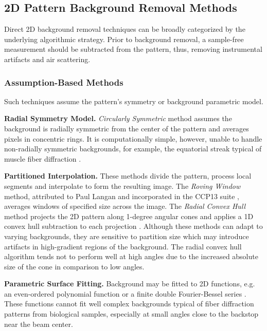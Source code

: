\documentclass[iucr,review]{iucrjournals}
\begin{document}
\subsection{2D Pattern Background Removal Methods}

Direct 2D background removal techniques can be broadly categorized by the underlying algorithmic strategy.
Prior to background removal, a sample-free measurement should be subtracted from the pattern,
thus, removing instrumental artifacts and air scattering.

    \subsubsection{Assumption-Based Methods}
        Such techniques assume the pattern's symmetry or background parametric model.

        \textbf{Radial Symmetry Model.} \emph{Circularly Symmetric} method assumes the background is radially symmetric from the center of the pattern
        and averages pixels in concentric rings. It is computationally simple, however, unable to handle non-radially symmetric backgrounds,
        for example, the equatorial streak typical of muscle fiber diffraction \cite{rajkumar2007fibrefix}.
        
        \textbf{Partitioned Interpolation.} These methods divide the pattern, process local segments and interpolate to form the resulting image. 
        The \emph{Roving Window} method, attributed to Paul Langan and incorporated in the CCP13 suite \cite{HeEtAl2007},
        averages windows of specified size across the image. 
        The \emph{Radial Convex Hull} method projects the 2D pattern along 1-degree angular cones and
        applies a 1D convex hull subtraction to each projection \cite{MuscleXQuadrantFolding}. 
        Although these methods can adapt to varying backgrounds,
        they are sensitive to partition size which may introduce artifacts
        in high-gradient regions of the background. The radial convex hull algorithm tends not to perform
        well at high angles due to the increased absolute size of the cone in comparison to low angles.

        \textbf{Parametric Surface Fitting.} Background may be fitted to 2D functions, e.g.
        an even-ordered polynomial function or a finite double Fourier-Bessel series 
        \cite{LorenzHolmes1993, MillaneArnott1985, Makowski1978}.
        These functions cannot fit well complex backgrounds typical
        of fiber diffraction patterns from biological samples, especially at small angles close to the
        backstop near the beam center.
\end{document}
